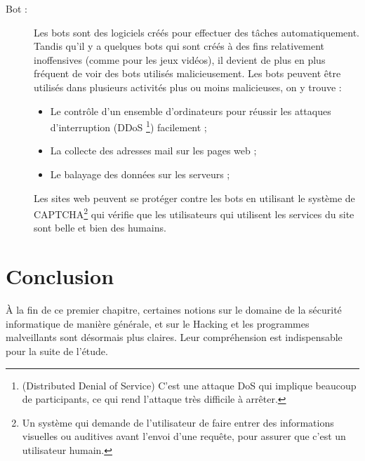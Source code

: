 \begin{description}
        \item[Bot :] Les bots sont des logiciels créés pour effectuer des tâches automatiquement. 
            Tandis qu’il y a quelques bots qui sont créés à des fins relativement inoffensives 
            (comme pour les jeux vidéos), il devient de plus en plus fréquent de voir des bots utilisés malicieusement. 
            Les bots peuvent être utilisés dans plusieurs activités plus ou moins malicieuses, on y trouve :
            \begin{itemize}
                \item Le contrôle d'un ensemble d’ordinateurs pour réussir les attaques d’interruption (DDoS
                    \footnote{(Distributed Denial of Service) C'est une attaque DoS qui implique beaucoup de
                    participants, ce qui rend l'attaque très difficile à arrêter.}) facilement ;
                \item La collecte des adresses mail sur les pages web ;
                \item Le balayage des données sur les serveurs ;
            \end{itemize}
            Les sites web peuvent se protéger contre les bots en utilisant le système de 
            CAPTCHA\footnote{Un système qui demande de l'utilisateur de faire entrer des informations visuelles ou
            auditives avant l'envoi d'une requête, pour assurer que c'est un utilisateur humain.} qui vérifie que 
            les utilisateurs qui utilisent les services du site sont belle et bien des humains. 
            \cite{malware_types} %
    \end{description}


\section{Conclusion}
À la fin de ce premier chapitre, certaines notions sur le domaine de la sécurité informatique de manière générale, et sur le Hacking et les programmes malveillants sont désormais plus claires. 
Leur compréhension est indispensable pour la suite de l'étude. %
